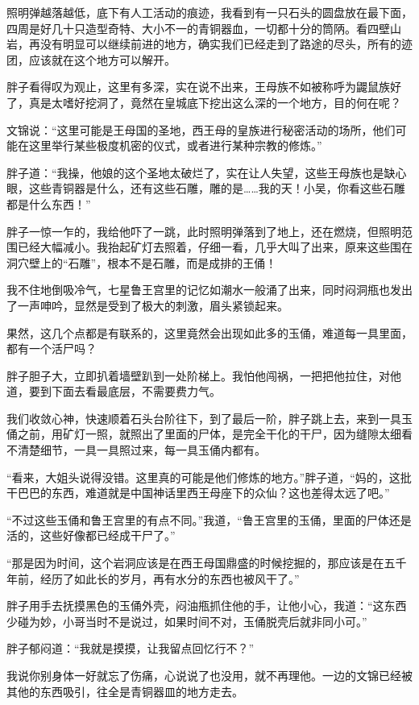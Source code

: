 照明弹越落越低，底下有人工活动的痕迹，我看到有一只石头的圆盘放在最下面，四周是好几十只造型奇特、大小不一的青铜器血，一切都十分的筒陃。看四壁山岩，再没有明显可以继续前进的地方，确实我们已经走到了路途的尽头，所有的迹团，应该就在这个地方可以解开。

胖子看得叹为观止，这里有多深，实在说不出来，王母族不如被称呼为鼹鼠族好了，真是太嗜好挖洞了，竟然在皇城底下挖出这么深的一个地方，目的何在呢？

文锦说：“这里可能是王母国的圣地，西王母的皇族进行秘密活动的场所，他们可能在这里举行某些极度机密的仪式，或者进行某种宗教的修炼。”

胖子道：“我操，他娘的这个圣地太破烂了，实在让人失望，这些王母族也是缺心眼，这些青铜器是什么，还有这些石雕，雕的是……我的天！小吴，你看这些石雕都是什么东西！”

胖子一惊一乍的，我给他吓了一跳，此时照明弹落到了地上，还在燃烧，但照明范围已经大幅减小。我抬起矿灯去照着，仔细一看，几乎大叫了出来，原来这些围在洞穴壁上的“石雕”，根本不是石雕，而是成排的王俑！

我不住地倒吸冷气，七星鲁王宫里的记忆如潮水一般涌了出来，同时闷洞甁也发出了一声呻吟，显然是受到了极大的刺激，眉头紧锁起来。

果然，这几个点都是有联系的，这里竟然会出现如此多的玉俑，难道每一具里面，都有一个活尸吗？

胖子胆子大，立即扒着墙壁趴到一处阶梯上。我怕他闯祸，一把把他拉住，对他道，要到下面去看最底层，不需要费力气。

我们收敛心神，快速顺着石头台阶往下，到了最后一阶，胖子跳上去，来到一具玉俑之前，用矿灯一照，就照出了里面的尸体，是完全干化的干尸，因为缝隙太细看不清楚细节，一具一具照过来，每一具玉俑内都有。

“看来，大姐头说得没错。这里真的可能是他们修炼的地方。”胖子道，“妈的，这批干巴巴的东西，难道就是中国神话里西王母座下的众仙？这也差得太远了吧。”

“不过这些玉俑和鲁王宫里的有点不同。”我道，“鲁王宫里的玉俑，里面的尸体还是活的，这些好像都已经成干尸了。”

“那是因为时间，这个岩洞应该是在西王母国鼎盛的时候挖掘的，那应该是在五千年前，经历了如此长的岁月，再有水分的东西也被风干了。”

胖子用手去抚摸黑色的玉俑外壳，闷油甁抓住他的手，让他小心，我道：“这东西少碰为妙，小哥当时不是说过，如果时间不对，玉俑脱壳后就非同小可。”

胖子郁闷道：“我就是摸摸，让我留点回忆行不？”

我说你别身体一好就忘了伤痛，心说说了也没用，就不再理他。一边的文锦已经被其他的东西吸引，往全是青铜器皿的地方走去。

